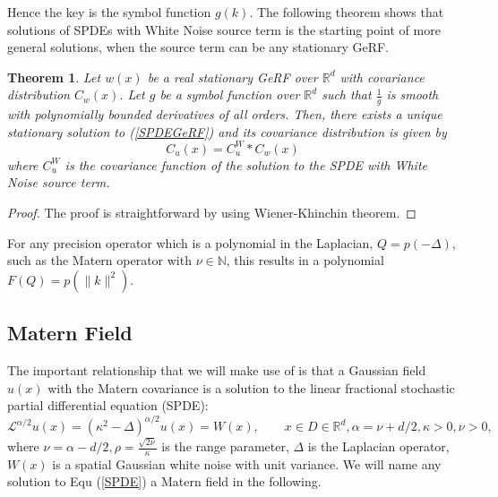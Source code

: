 \documentclass{article}
\newtheorem{theorem}{Theorem}
\begin{document}
Hence the key is the symbol function $g(k)$.
The following theorem shows that solutions of SPDEs with White Noise source term is the starting point of more general solutions, when the source term can be any stationary GeRF.
\begin{theorem}\label{uniquenessandexistence}
	Let $w(x)$ be a real stationary GeRF over $\mathbb{R}^d$ with covariance distribution $C_w(x)$. 
	Let $g$ be a symbol function over $\mathbb{R}^d$ such that $\frac{1}{g}$ is smooth with polynomially bounded derivatives of all orders. 
	Then, there exists a unique stationary solution to (\ref{SPDEGeRF}) and its covariance distribution is given by
\begin{equation}
	C_u(x) = C_u^W * C_w(x)
\end{equation}
where $C_u^W$ is the covariance function of the solution to the SPDE with White Noise source term.
\end{theorem}
\begin{proof}
	The proof is straightforward by using Wiener-Khinchin theorem.
\end{proof}
For any precision operator which is a polynomial in the Laplacian, $Q = p(-\Delta)$, such as the Matern operator with $\nu \in \mathbb{N}$, 
this results in a polynomial $F(Q) = p(\|k\|^2)$.
\subsection{Matern Field}
The important relationship that we will make use of is that a Gaussian field $u(x)$ with the Matern covariance is 
a solution to the linear fractional stochastic partial differential equation (SPDE):
\begin{equation}\label{SPDE}
	\mathcal{L}^{\alpha/2}u(x) = (\kappa^2 - \Delta)^{\alpha/2} u(x) = W(x), \qquad x\in D\in \mathbb{R}^d, \alpha=\nu + d/2, \kappa>0, \nu>0,
\end{equation}
where $\nu = \alpha - d/2, \rho = \frac{\sqrt{2\nu}}{\kappa}$ is the range parameter, $\Delta$ is the Laplacian operator, $W(x)$ is a spatial Gaussian white noise with unit variance.
We will name any solution to Equ (\ref{SPDE}) a Matern field in the following. 
\end{document}
